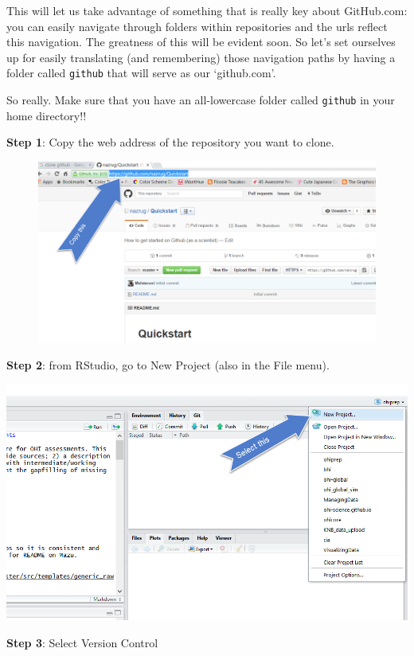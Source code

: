 \documentclass[]{book}
\theoremstyle{definition}
\theoremstyle{definition}
\theoremstyle{definition}
\theoremstyle{remark}
\begin{document}
This will let us take advantage of something that is really key about
GitHub.com: you can easily navigate through folders within repositories
and the urls reflect this navigation. The greatness of this will be
evident soon. So let's set ourselves up for easily translating (and
remembering) those navigation paths by having a folder called
\texttt{github} that will serve as our `github.com'.

So really. Make sure that you have an all-lowercase folder called
\texttt{github} in your home directory!!

\textbf{Step 1}: Copy the web address of the repository you want to
clone.

\begin{figure}[htbp]
\centering
\includegraphics{img/clone_step1.png}
\caption{}
\end{figure}

\textbf{Step 2}: from RStudio, go to New Project (also in the File
menu).

\includegraphics{img/new_project_1.png}

\textbf{Step 3}: Select Version Control
\end{document}
